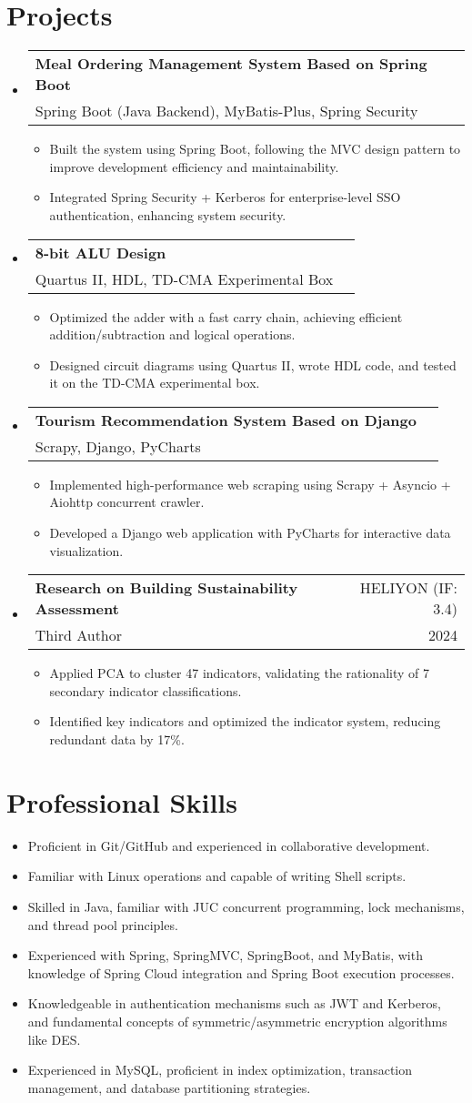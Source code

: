 \documentclass[a4paper,11pt]{article}
\makeatletter
\newenvironment{resumeList}{\begin{itemize}[leftmargin=*,label={}]}{\end{itemize}}
\newcommand{\resumeItem}[1]{\item\small{#1}}
\newcommand{\resumeEntry}[4]{
  \item \begin{tabular*}{0.97\textwidth}[t]{l@{\extracolsep{\fill}}r}
    \textbf{#1} & #2 \\
    #3 & #4 \\
  \end{tabular*}
}
\makeatother
\begin{document}
\section{Projects}
\begin{resumeList}
    \resumeEntry{Meal Ordering Management System Based on Spring Boot}{}{Spring Boot (Java Backend), MyBatis-Plus, Spring Security}{}
    \begin{resumeList}
        \resumeItem{Built the system using Spring Boot, following the MVC design pattern to improve development efficiency and maintainability.}
        \resumeItem{Integrated Spring Security + Kerberos for enterprise-level SSO authentication, enhancing system security.}
    \end{resumeList}
    \resumeEntry{8-bit ALU Design}{}{Quartus II, HDL, TD-CMA Experimental Box}{}
    \begin{resumeList}
        \resumeItem{Optimized the adder with a fast carry chain, achieving efficient addition/subtraction and logical operations.}
        \resumeItem{Designed circuit diagrams using Quartus II, wrote HDL code, and tested it on the TD-CMA experimental box.}
    \end{resumeList}
    \resumeEntry{Tourism Recommendation System Based on Django}{}{Scrapy, Django, PyCharts}{}
    \begin{resumeList}
        \resumeItem{Implemented high-performance web scraping using Scrapy + Asyncio + Aiohttp concurrent crawler.}
        \resumeItem{Developed a Django web application with PyCharts for interactive data visualization.}
    \end{resumeList}
    \resumeEntry{Research on Building Sustainability Assessment}{HELIYON (IF: 3.4)}{Third Author}{2024}
    \begin{resumeList}
        \resumeItem{Applied PCA to cluster 47 indicators, validating the rationality of 7 secondary indicator classifications.}
        \resumeItem{Identified key indicators and optimized the indicator system, reducing redundant data by 17\%.}
    \end{resumeList}
\end{resumeList}

\section{Professional Skills}
\begin{resumeList}
    \resumeItem{Proficient in Git/GitHub and experienced in collaborative development.}
    \resumeItem{Familiar with Linux operations and capable of writing Shell scripts.}
    \resumeItem{Skilled in Java, familiar with JUC concurrent programming, lock mechanisms, and thread pool principles.}
    \resumeItem{Experienced with Spring, SpringMVC, SpringBoot, and MyBatis, with knowledge of Spring Cloud integration and Spring Boot execution processes.}
    \resumeItem{Knowledgeable in authentication mechanisms such as JWT and Kerberos, and fundamental concepts of symmetric/asymmetric encryption algorithms like DES.}
    \resumeItem{Experienced in MySQL, proficient in index optimization, transaction management, and database partitioning strategies.}
\end{resumeList}
\end{document}
